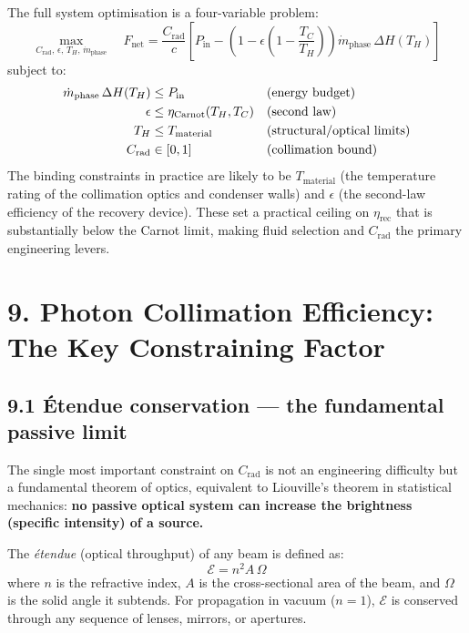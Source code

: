 \documentclass[12pt]{article}
\begin{document}
The full system optimisation is a four-variable problem:
\[
  \max_{C_{\mathrm{rad}},\,\epsilon,\,T_H,\,\dot{m}_{\mathrm{phase}}}
  \quad
  F_{\mathrm{net}} = \frac{C_{\mathrm{rad}}}{c}
  \left[P_{\mathrm{in}} -
  \left(1 - \epsilon\!\left(1-\frac{T_C}{T_H}\right)\right)
  \dot{m}_{\mathrm{phase}}\,\Delta H(T_H)\right]
\]
subject to:
\begin{align}
  \dot{m}_{\mathrm{phase}}\,\Delta H(T_H) &\leq P_{\mathrm{in}}
    & &\text{(energy budget)} \notag \\
  \epsilon &\leq \eta_{\mathrm{Carnot}}(T_H,T_C)
    & &\text{(second law)} \notag \\
  T_H &\leq T_{\mathrm{material}}
    & &\text{(structural/optical limits)} \notag \\
  C_{\mathrm{rad}} &\in [0,1]
    & &\text{(collimation bound)} \notag
\end{align}
The binding constraints in practice are likely to be $T_{\mathrm{material}}$
(the temperature rating of the collimation optics and condenser walls) and
$\epsilon$ (the second-law efficiency of the recovery device). These set a
practical ceiling on $\eta_{\mathrm{rec}}$ that is substantially below the
Carnot limit, making fluid selection and $C_{\mathrm{rad}}$ the primary
engineering levers.


\section*{9. Photon Collimation Efficiency: The Key Constraining Factor}

\subsection*{9.1 \'{E}tendue conservation — the fundamental passive limit}

The single most important constraint on $C_{\mathrm{rad}}$ is not an engineering
difficulty but a fundamental theorem of optics, equivalent to Liouville's theorem
in statistical mechanics: \textbf{no passive optical system can increase the
brightness (specific intensity) of a source.}

The \emph{\'{e}tendue} (optical throughput) of any beam is defined as:
\[
  \mathcal{E} = n^2 A\,\Omega
\]
where $n$ is the refractive index, $A$ is the cross-sectional area of the beam,
and $\Omega$ is the solid angle it subtends. For propagation in vacuum ($n=1$),
$\mathcal{E}$ is conserved through any sequence of lenses, mirrors, or apertures.
\end{document}
